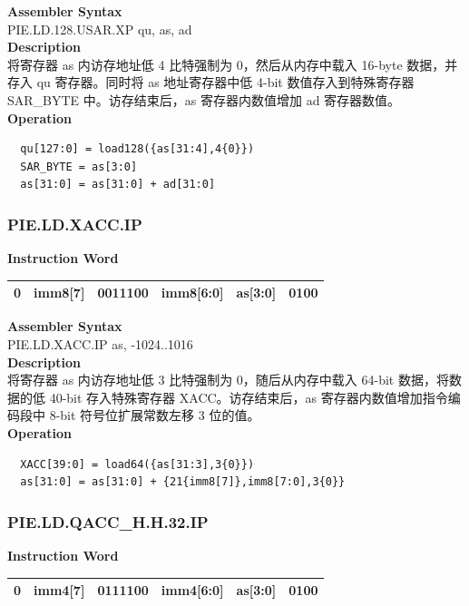 \textbf{Assembler Syntax} \\
PIE.LD.128.USAR.XP qu, as, ad \\
\textbf{Description} \\
将寄存器 as 内访存地址低 4 比特强制为 0，然后从内存中载入 16-byte 数据，并存入 qu 寄存器。同时将 as 地址寄存器中低 4-bit 数值存入到特殊寄存器 SAR\_BYTE 中。访存结束后，as 寄存器内数值增加 ad 寄存器数值。\\
\textbf{Operation}
\begin{lstlisting}
  qu[127:0] = load128({as[31:4],4{0}})
  SAR_BYTE = as[3:0]
  as[31:0] = as[31:0] + ad[31:0]
\end{lstlisting}

\newpage
\subsubsection{PIE.LD.XACC.IP}\label{instruction:PIELDXACCIP}
\setlength\tabcolsep{6pt}
\textbf{Instruction Word} \\
\begin{tabular}{|c|c|c|c|c|c|}
	\hline
	0 & imm8[7] & 0011100 & imm8[6:0] & as[3:0] & 0100 \\
	\hline
\end{tabular}

\textbf{Assembler Syntax} \\
PIE.LD.XACC.IP as, -1024..1016 \\
\textbf{Description} \\
将寄存器 as 内访存地址低 3 比特强制为 0，随后从内存中载入 64-bit 数据，将数据的低 40-bit 存入特殊寄存器 XACC。访存结束后，as 寄存器内数值增加指令编码段中 8-bit 符号位扩展常数左移 3 位的值。\\
\textbf{Operation}
\begin{lstlisting}
  XACC[39:0] = load64({as[31:3],3{0}})
  as[31:0] = as[31:0] + {21{imm8[7]},imm8[7:0],3{0}}
\end{lstlisting}

\newpage
\subsubsection{PIE.LD.QACC\_H.H.32.IP}\label{instruction:PIELDQACCHH32IP}
\setlength\tabcolsep{6pt}
\textbf{Instruction Word} \\
\begin{tabular}{|c|c|c|c|c|c|}
	\hline
	0 & imm4[7] & 0111100 & imm4[6:0] & as[3:0] & 0100 \\
	\hline
\end{tabular}

